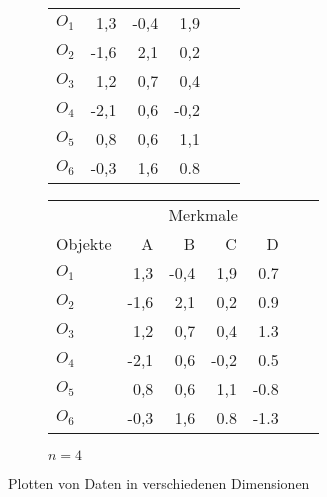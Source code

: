 \begin{figure}[H]
{\begin{minipage}{\textwidth}
\begin{subfigure}{\textwidth}
\begin{tabular}{lrrrrr}
            \midrule
            \(O_1\)  & 1,3 & -0,4 & 1,9 \\
            \(O_2\) & -1,6 & 2,1 & 0,2 \\
            \(O_3\) & 1,2 & 0,7 & 0,4 \\
            \(O_4\) & -2,1 & 0,6 & -0,2 \\
            \(O_5\) & 0,8 & 0,6 & 1,1 \\
            \(O_6\) & -0,3 & 1,6 & 0.8 \\
            \bottomrule
        \end{tabular}
        \hspace{17pt}
    \end{subfigure}
    \begin{subfigure}{\textwidth}
        \caption{\(n=4\)}
        \begin{tabular}{lrrrrrr}
            \toprule
            & \multicolumn{4}{c}{Merkmale} \\
            \cmidrule(lr){2-5}
            Objekte & A & B & C & D \\ 
            \midrule
            \(O_1\)  & 1,3 & -0,4 & 1,9 & 0.7 \\
            \(O_2\) & -1,6 & 2,1 & 0,2 & 0.9 \\
            \(O_3\) & 1,2 & 0,7 & 0,4 & 1.3 \\
            \(O_4\) & -2,1 & 0,6 & -0,2 & 0.5 \\
            \(O_5\) & 0,8 & 0,6 & 1,1 & -0.8 \\
            \(O_6\) & -0,3 & 1,6 & 0.8 & -1.3 \\
            \bottomrule
        \end{tabular}
        \hspace{45pt}
    \end{subfigure}
    \end{minipage}
    }
    \caption{Plotten von Daten in verschiedenen Dimensionen}\label{fig:pcadim}
\end{figure}
